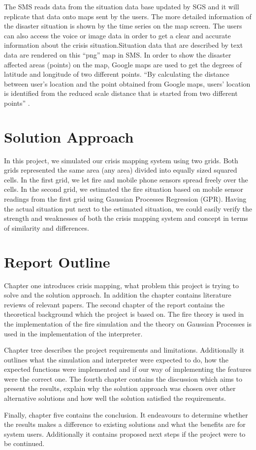 The SMS reads data from the situation data base updated by SGS and it will replicate that data onto maps sent by the users. The more detailed information of the disaster situation is shown by the time series on the map screen. The users can also access the voice or image data  in order to get a clear and accurate information about the crisis situation.Situation data that are described by text data are rendered on this “png” map in SMS. In order to show the disaster affected areas (points) on the map, Google maps are used to get the degrees of latitude and longitude of two different points. “By calculating the distance between user’s location and the point obtained from Google maps, users’ location is identified from the reduced scale distance that is started from two different points” \cite{springlink}.

\section{Solution Approach}

In this project, we simulated our crisis mapping system using two grids. Both grids represented the same area (any area) divided into equally sized squared cells. In the first grid, we let fire and mobile phone sensors spread freely over the cells. In the second grid, we estimated the fire situation based on mobile sensor readings from the first grid using Gaussian Processes Regression (GPR). Having the actual situation put next to the estimated situation, we could easily verify the strength and weaknesses of both the crisis mapping system and concept in terms of similarity and differences.

\section{Report Outline}

Chapter one introduces crisis mapping, what problem this project is trying to solve and the solution approach. In addition the chapter contains literature reviews of relevant papers. The second chapter of the report contains the theoretical background which the project is based on. The fire theory is used in the implementation of the fire simulation and the theory on Gaussian Processes is used in the implementation of the interpreter.

Chapter tree describes the project requirements and limitations. Additionally it outlines what the simulation and interpreter were expected to do, how the expected functions were implemented and if our way of implementing the features were the correct one. The fourth chapter contains the discussion which aims to present the results, explain why the solution approach was chosen over other alternative solutions and how well the solution satisfied the requirements.

Finally, chapter five contains the conclusion. It endeavours to determine whether the results makes a difference to existing solutions and what the benefits are for system users. Additionally it contains proposed next steps if the project were to be continued.